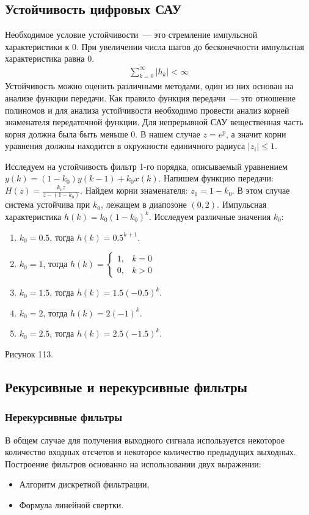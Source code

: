 \subsection{Устойчивость цифровых САУ}
Необходимое условие устойчивости~--- это стремление импульсной характеристики к 0. При увеличении числа шагов до бесконечности импульсная характеристика равна 0.
\begin{align*}
	\sum\limits^{\infty}_{k=0}|h_k|<\infty 
\end{align*}
Устойчивость можно оценить различными методами, один из них основан на анализе функции передачи. Как правило функция передачи~--- это отношение полиномов и для анализа устойчивости необходимо провести анализ корней знаменателя передаточной функции. Для непрерывной САУ вещественная часть корня должна была быть меньше 0. В нашем случае $z=e^p$, а значит корни уравнения должны находится в окружности единичного радиуса $|z_i|\leq1$.

Исследуем на устойчивость фильтр 1-го порядка, описываемый уравнением $y(k)=(1-k_0)y(k-1)+k_0x(k)$. Напишем функцию передачи: $H(z)=\frac{k_0z}{z-(1-k_0)}$. Найдем корни знаменателя: $z_1=1-k_0$. В этом случае система устойчива при $k_0$, лежащем в диапозоне $(0,2)$. Импульсная характеристика $h(k)=k_0(1-k_0)^k$. Исследуем различные значения $k_0$:
\begin{enumerate}
	\item $k_0=0.5$, тогда $h(k)=0.5^{k+1}$.
	\item $k_0=1$, тогда $h(k)=\left\{\begin{array}{cc}
		1, &k=0 \\
		0, &k>0
	\end{array}\right.$
	\item $k_0=1.5$, тогда $h(k)=1.5(-0.5)^k$.
	\item $k_0=2$, тогда $h(k)=2(-1)^k$.
	\item $k_0=2.5$, тогда $h(k)=2.5(-1.5)^k$. 
\end{enumerate}
Рисунок 113.

\subsection{Рекурсивные и нерекурсивные фильтры}
\subsubsection{Нерекурсивные фильтры}
В общем случае для получения выходного сигнала используется некоторое количество входных отсчетов и некоторое количество предыдущих выходных. Построение фильтров основанно на использовании двух выражении:
\begin{itemize}
	\item Алгоритм дискретной фильтрации,
	\item Формула линейной свертки.
\end{itemize}

